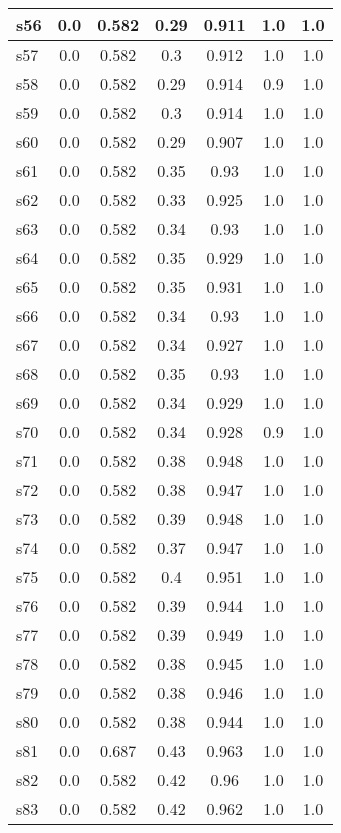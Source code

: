 \documentclass{article}
\begin{document}
\begin{tabular}{|l|c|c|c|c|c|c|}
\hline
s56 &0.0 & 0.582 & 0.29 & 0.911 & 1.0 & 1.0\\
\hline
s57 &0.0 & 0.582 & 0.3 & 0.912 & 1.0 & 1.0\\
\hline
s58 &0.0 & 0.582 & 0.29 & 0.914 & 0.9 & 1.0\\
\hline
s59 &0.0 & 0.582 & 0.3 & 0.914 & 1.0 & 1.0\\
\hline
s60 &0.0 & 0.582 & 0.29 & 0.907 & 1.0 & 1.0\\
\hline
s61 &0.0 & 0.582 & 0.35 & 0.93 & 1.0 & 1.0\\
\hline
s62 &0.0 & 0.582 & 0.33 & 0.925 & 1.0 & 1.0\\
\hline
s63 &0.0 & 0.582 & 0.34 & 0.93 & 1.0 & 1.0\\
\hline
s64 &0.0 & 0.582 & 0.35 & 0.929 & 1.0 & 1.0\\
\hline
s65 &0.0 & 0.582 & 0.35 & 0.931 & 1.0 & 1.0\\
\hline
s66 &0.0 & 0.582 & 0.34 & 0.93 & 1.0 & 1.0\\
\hline
s67 &0.0 & 0.582 & 0.34 & 0.927 & 1.0 & 1.0\\
\hline
s68 &0.0 & 0.582 & 0.35 & 0.93 & 1.0 & 1.0\\
\hline
s69 &0.0 & 0.582 & 0.34 & 0.929 & 1.0 & 1.0\\
\hline
s70 &0.0 & 0.582 & 0.34 & 0.928 & 0.9 & 1.0\\
\hline
s71 &0.0 & 0.582 & 0.38 & 0.948 & 1.0 & 1.0\\
\hline
s72 &0.0 & 0.582 & 0.38 & 0.947 & 1.0 & 1.0\\
\hline
s73 &0.0 & 0.582 & 0.39 & 0.948 & 1.0 & 1.0\\
\hline
s74 &0.0 & 0.582 & 0.37 & 0.947 & 1.0 & 1.0\\
\hline
s75 &0.0 & 0.582 & 0.4 & 0.951 & 1.0 & 1.0\\
\hline
s76 &0.0 & 0.582 & 0.39 & 0.944 & 1.0 & 1.0\\
\hline
s77 &0.0 & 0.582 & 0.39 & 0.949 & 1.0 & 1.0\\
\hline
s78 &0.0 & 0.582 & 0.38 & 0.945 & 1.0 & 1.0\\
\hline
s79 &0.0 & 0.582 & 0.38 & 0.946 & 1.0 & 1.0\\
\hline
s80 &0.0 & 0.582 & 0.38 & 0.944 & 1.0 & 1.0\\
\hline
s81 &0.0 & 0.687 & 0.43 & 0.963 & 1.0 & 1.0\\
\hline
s82 &0.0 & 0.582 & 0.42 & 0.96 & 1.0 & 1.0\\
\hline
s83 &0.0 & 0.582 & 0.42 & 0.962 & 1.0 & 1.0\\
\hline

\end{tabular}
\end{document}
